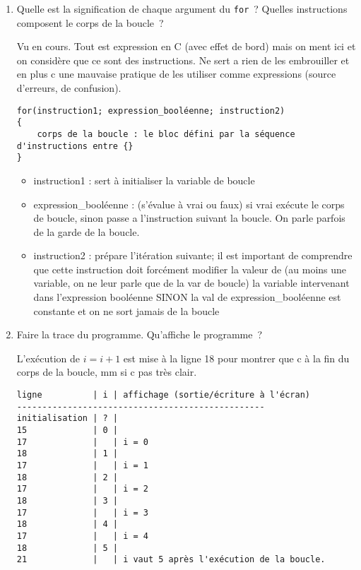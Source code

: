 \begin{enumerate}
\item Quelle est la signification de chaque argument du \verb|for|~?
  Quelles instructions composent le corps de la boucle~?
  \begin{correction}
    Vu en cours. Tout est expression en C (avec effet de bord) mais on
    ment ici et on considère que ce sont des instructions. Ne sert a
    rien de les embrouiller et en plus c une mauvaise pratique de les
    utiliser comme expressions (source d'erreurs, de confusion). 
\begin{verbatim}
for(instruction1; expression_booléenne; instruction2)
{
    corps de la boucle : le bloc défini par la séquence d'instructions entre {}
}
\end{verbatim}
    \begin{itemize}
    \item instruction1 : sert à initialiser la variable de boucle

    \item expression\_booléenne : (s'évalue à vrai ou faux) si vrai
      exécute le corps de boucle, sinon passe a l'instruction suivant
      la boucle. On parle parfois de la garde de la boucle. 

    \item instruction2 : prépare l'itération suivante; il est
      important de comprendre que cette instruction doit forcément
      modifier la valeur de (au moins une variable, on ne leur parle
      que de la var de boucle) la variable intervenant dans
      l'expression booléenne SINON la val de expression\_booléenne est
      constante et on ne sort jamais de la boucle 
    \end{itemize}
  \end{correction}
\item Faire la trace du programme. Qu'affiche le programme~?
\begin{correction}
L'exécution de $i = i + 1$ est mise à la ligne 18 pour montrer que c à
la fin du corps de la boucle, mm si c pas très clair.
\begin{verbatim}
ligne          | i | affichage (sortie/écriture à l'écran)
-------------------------------------------------
initialisation | ? |
15             | 0 |
17             |   | i = 0
18             | 1 | 
17             |   | i = 1
18             | 2 | 
17             |   | i = 2
18             | 3 | 
17             |   | i = 3
18             | 4 | 
17             |   | i = 4
18             | 5 | 
21             |   | i vaut 5 après l'exécution de la boucle.
\end{verbatim}


\end{correction}
\end{enumerate}
